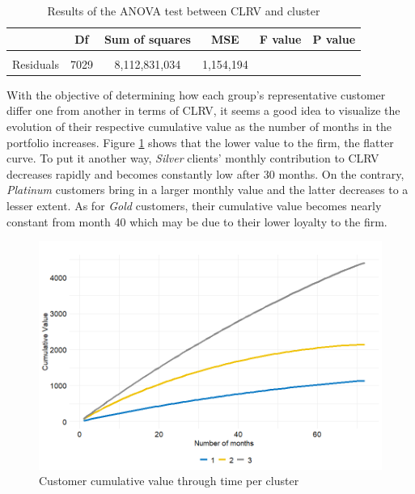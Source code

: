 \documentclass[
]{book}
\begin{document}
\begin{table}[H]

\caption{\label{tab:aov}Results of the ANOVA test between CLRV and cluster}
\centering
\begin{tabular}[t]{lccccc}
\toprule
  & Df & Sum of squares & MSE & F value & P value\\
\midrule
\cellcolor{gray!6}{Cluster} & \cellcolor{gray!6}{2} & \cellcolor{gray!6}{12,016,055,579} & \cellcolor{gray!6}{6,008,027,789} & \cellcolor{gray!6}{5,205.39} & \cellcolor{gray!6}{0}\\
Residuals & 7029 & 8,112,831,034 & 1,154,194 &  & \\
\bottomrule
\end{tabular}
\end{table}

With the objective of determining how each group's representative customer differ one from another in terms of CLRV, it seems a good idea to visualize the evolution of their respective cumulative value as the number of months in the portfolio increases. Figure \ref{fig:clrvEvolutionClust} shows that the lower value to the firm, the flatter curve. To put it another way, \emph{Silver} clients' monthly contribution to CLRV decreases rapidly and becomes constantly low after 30 months. On the contrary, \emph{Platinum} customers bring in a larger monthly value and the latter decreases to a lesser extent. As for \emph{Gold} customers, their cumulative value becomes nearly constant from month 40 which may be due to their lower loyalty to the firm.

\begin{figure}

{\centering \includegraphics[width=12.5in]{./imgs/clrv_evolution_per_cluster} 

}

\caption{Customer cumulative value through time per cluster}\label{fig:clrvEvolutionClust}
\end{figure}
\end{document}
